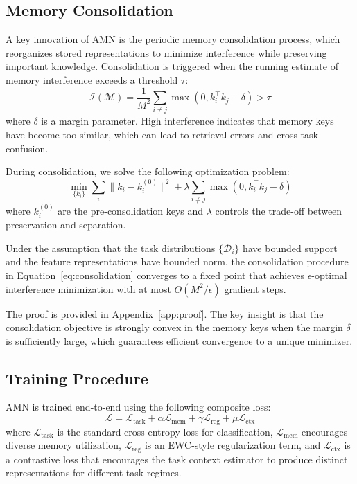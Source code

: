\documentclass[11pt]{article}
\begin{document}
\subsection{Memory Consolidation}
\label{sec:consolidation}

A key innovation of AMN is the periodic memory consolidation process, which reorganizes stored representations to minimize interference while preserving important knowledge. Consolidation is triggered when the running estimate of memory interference exceeds a threshold $\tau$:
\begin{equation}
    \mathcal{I}(\mathcal{M}) = \frac{1}{M^2} \sum_{i \neq j} \max(0, k_i^\top k_j - \delta) > \tau
\end{equation}
where $\delta$ is a margin parameter. High interference indicates that memory keys have become too similar, which can lead to retrieval errors and cross-task confusion.

During consolidation, we solve the following optimization problem:
\begin{equation}
    \min_{\{k_i\}} \sum_{i} \|k_i - k_i^{(0)}\|^2 + \lambda \sum_{i \neq j} \max(0, k_i^\top k_j - \delta)
    \label{eq:consolidation}
\end{equation}
where $k_i^{(0)}$ are the pre-consolidation keys and $\lambda$ controls the trade-off between preservation and separation.

\begin{theorem}
\label{thm:convergence}
Under the assumption that the task distributions $\{\mathcal{D}_i\}$ have bounded support and the feature representations have bounded norm, the consolidation procedure in Equation~\ref{eq:consolidation} converges to a fixed point that achieves $\epsilon$-optimal interference minimization with at most $O(M^2 / \epsilon)$ gradient steps.
\end{theorem}

The proof is provided in Appendix~\ref{app:proof}. The key insight is that the consolidation objective is strongly convex in the memory keys when the margin $\delta$ is sufficiently large, which guarantees efficient convergence to a unique minimizer.

\subsection{Training Procedure}

AMN is trained end-to-end using the following composite loss:
\begin{equation}
    \mathcal{L} = \mathcal{L}_{\text{task}} + \alpha \mathcal{L}_{\text{mem}} + \gamma \mathcal{L}_{\text{reg}} + \mu \mathcal{L}_{\text{ctx}}
\end{equation}
where $\mathcal{L}_{\text{task}}$ is the standard cross-entropy loss for classification, $\mathcal{L}_{\text{mem}}$ encourages diverse memory utilization, $\mathcal{L}_{\text{reg}}$ is an EWC-style regularization term, and $\mathcal{L}_{\text{ctx}}$ is a contrastive loss that encourages the task context estimator to produce distinct representations for different task regimes.
\end{document}
